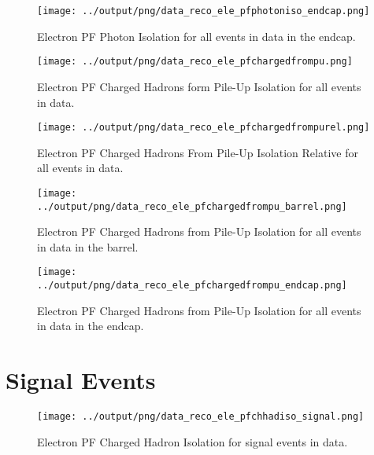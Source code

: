 \documentclass[11pt]{book}
\begin{document}
\begin{figure}[htb]
\centering
\texttt{[image: ../output/png/data\_reco\_ele\_pfphotoniso\_endcap.png]}
\caption{Electron PF Photon Isolation for all events in data in the endcap.}
\label{fig:data_ele_pfphotoniso_endcap}
\end{figure}

\begin{figure}[htb]
\centering
\texttt{[image: ../output/png/data\_reco\_ele\_pfchargedfrompu.png]}
\caption{Electron PF Charged Hadrons form Pile-Up Isolation for all events in data.}
\label{fig:data_ele_pfchargedfrompu}
\end{figure}

\begin{figure}[htb]
\centering
\texttt{[image: ../output/png/data\_reco\_ele\_pfchargedfrompurel.png]}
\caption{Electron PF Charged Hadrons From Pile-Up Isolation Relative for all events in data.}
\label{fig:data_ele_pfchargedfrompurel}
\end{figure}

\begin{figure}[htb]
\centering
\texttt{[image: ../output/png/data\_reco\_ele\_pfchargedfrompu\_barrel.png]}
\caption{Electron PF Charged Hadrons from Pile-Up Isolation for all events in data in the barrel.}
\label{fig:data_ele_pfchargedfrompu_barrel}
\end{figure}

\begin{figure}[htb]
\centering
\texttt{[image: ../output/png/data\_reco\_ele\_pfchargedfrompu\_endcap.png]}
\caption{Electron PF Charged Hadrons from Pile-Up Isolation for all events in data in the endcap.}
\label{fig:data_ele_pfchargedfrompu_endcap}
\end{figure}

\clearpage




\section{Signal Events}

\begin{figure}[htb]
\centering
\texttt{[image: ../output/png/data\_reco\_ele\_pfchhadiso\_signal.png]}
\caption{Electron PF Charged Hadron Isolation for signal events in data.}
\label{fig:data_ele_pfchhadiso_signal}
\end{figure}
\end{document}
